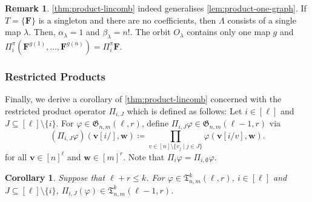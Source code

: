 \documentclass[10pt,a4paper]{article}
\theoremstyle{definition}
\newtheorem{remark}[definition]{Remark}
\theoremstyle{plain}
\newtheorem{corollary}[definition]{Corollary}
\theoremstyle{remark}
\renewcommand{\phi}{\varphi}
\begin{document}
	\begin{remark}
		\cref{thm:product-lincomb} indeed generalises \cref{lem:product-one-graph}.
		If $T = \{\boldsymbol{F}\}$ is a singleton and there are no coefficients,
		then $\Lambda$ consists of a single map $\lambda$.
		Then, $\alpha_\lambda = 1$ and  $\beta_\lambda = n!$.
		The orbit $O_\lambda$ contains only one map $g$ and $\Pi_i^\pi(\boldsymbol{F}^{g(1)}, \dots, \boldsymbol{F}^{g(n)}) = \Pi_i^\pi \boldsymbol{F}$.
	\end{remark}

	\subsubsection{Restricted Products}
	
	Finally, we derive a corollary of \cref{thm:product-lincomb} concerned with the restricted product operator $\Pi_{i, J}$ which is defined as follows:
	Let $i \in [\ell]$ and $J \subseteq [\ell] \setminus \{i\}$.
	For $\phi \in \mathfrak{G}_{n,m}(\ell, r)$,
	define $\Pi_{i, J} \phi \in \mathfrak{G}_{n,m}(\ell-1, r)$
	via \[ (\Pi_{i, J} \phi)(\boldsymbol{v}[i/], \boldsymbol{w}) \coloneqq \prod_{v \in [n] \setminus \{v_j \mid j \in J\}} \phi(\boldsymbol{v}[i/v], \boldsymbol{w}). \]
	for all $\boldsymbol{v} \in [n]^\ell$ and $\boldsymbol{w} \in [m]^r$.
	Note that $\Pi_i \phi = \Pi_{i, \emptyset} \phi$.

	
	\begin{corollary}\label{cor:product-exclude-lincomb}
		Suppose that $\ell+r \leq k$.
		For $\phi \in \mathfrak{T}^k_{n,m}(\ell,r )$,  $i \in [\ell]$ and $J \subseteq [\ell] \setminus \{i\}$,
		 $\Pi_{i, J} (\phi) \in \mathfrak{T}^k_{n,m}(\ell-1, r)$.
	\end{corollary}
\end{document}
